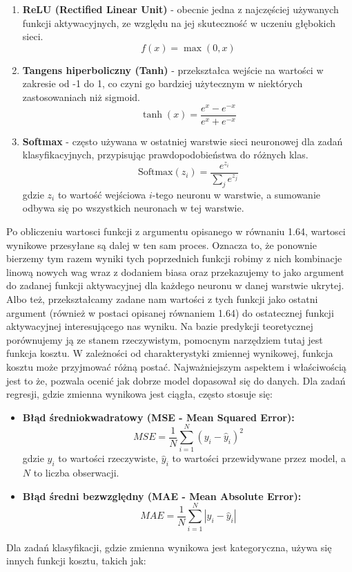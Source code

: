 \begin{enumerate}
\begin{enumerate}[label=\textbf{\arabic*.}]
    \item \textbf{ReLU (Rectified Linear Unit)} - obecnie jedna z najczęściej używanych funkcji aktywacyjnych, ze względu na jej skuteczność w uczeniu głębokich sieci.
    \[ f(x) = \max(0, x) \]
    
    \item \textbf{Tangens hiperboliczny (Tanh)} - przekształca wejście na wartości w zakresie od -1 do 1, co czyni go bardziej użytecznym w niektórych zastosowaniach niż sigmoid.
    \[ \tanh(x) = \frac{e^{x} - e^{-x}}{e^{x} + e^{-x}} \]
    
    \item \textbf{Softmax} - często używana w ostatniej warstwie sieci neuronowej dla zadań klasyfikacyjnych, przypisując prawdopodobieństwa do różnych klas.
    \[ \text{Softmax}(z_i) = \frac{e^{z_i}}{\sum_{j} e^{z_j}} \]
    gdzie \(z_i\) to wartość wejściowa \(i\)-tego neuronu w warstwie, a sumowanie odbywa się po wszystkich neuronach w tej warstwie.
\end{enumerate}
Po obliczeniu wartosci funkcji z argumentu opisanego w równaniu 1.64, wartosci wynikowe przesyłane są dalej w ten sam proces. Oznacza to, że ponownie bierzemy tym razem wyniki tych poprzednich funkcji robimy z nich kombinacje linową nowych wag wraz z dodaniem biasa oraz przekazujemy to jako argument do zadanej funkcji aktywacyjnej dla każdego neuronu w danej warstwie ukrytej. Albo też, przekształcamy zadane nam wartości z tych funkcji jako ostatni argument (również w postaci opisanej równaniem 1.64) do ostatecznej funkcji aktywacyjnej interesującego nas wyniku. Na bazie predykcji teoretycznej porównujemy ją ze stanem rzeczywistym, pomocnym narzędziem tutaj jest funkcja kosztu. W zależności od charakterystyki zmiennej wynikowej, funkcja kosztu może przyjmować różną postać. Najważniejszym aspektem i właściwością jest to że, pozwala ocenić jak dobrze model dopasował się do danych. Dla zadań regresji, gdzie zmienna wynikowa jest ciągła, często stosuje się:

\begin{itemize}
    \item \textbf{Błąd średniokwadratowy (MSE - Mean Squared Error):}
    \[ MSE = \frac{1}{N} \sum_{i=1}^{N} (y_i - \hat{y}_i)^2 \]
    gdzie $y_i$ to wartości rzeczywiste, $\hat{y}_i$ to wartości przewidywane przez model, a $N$ to liczba obserwacji.
    
    \item \textbf{Błąd średni bezwzględny (MAE - Mean Absolute Error):}
    \[ MAE = \frac{1}{N} \sum_{i=1}^{N} |y_i - \hat{y}_i| \]
\end{itemize}
Dla zadań klasyfikacji, gdzie zmienna wynikowa jest kategoryczna, używa się innych funkcji kosztu, takich jak:


\end{enumerate}
